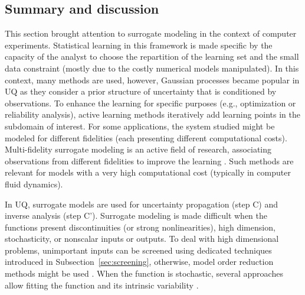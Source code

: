 \subsection{Summary and discussion}

This section brought attention to surrogate modeling in the context of computer experiments. 
Statistical learning in this framework is made specific by the capacity of the analyst to choose the repartition of the learning set and the small data constraint (mostly due to the costly numerical models manipulated). 
In this context, many methods are used, however, Gaussian processes became popular in UQ as they consider a prior structure of uncertainty that is conditioned by observations. %
To enhance the learning for specific purposes (e.g., optimization or reliability analysis), active learning methods iteratively add learning points in the subdomain of interest. 
For some applications, the system studied might be modeled for different fidelities (each presenting different computational costs). 
Multi-fidelity surrogate modeling is an active field of research, associating observations from different fidelities to improve the learning \citep{fernandez_2016_review_multifi}. 
Such methods are relevant for models with a very high computational cost (typically in computer fluid dynamics).  

In UQ, surrogate models are used for uncertainty propagation (step C) and inverse analysis (step C'). 
Surrogate modeling is made difficult when the functions present discontinuities (or strong nonlinearities), high dimension, stochasticity, or nonscalar inputs or outputs. 
To deal with high dimensional problems, unimportant inputs can be screened using dedicated techniques introduced in Subsection~\ref{sec:screening}, otherwise, model order reduction methods might be used \citep{schilders_2008}. 
When the function is stochastic, several approaches allow fitting the function and its intrinsic variability \citep{binois_2019_replication,baker_2022_stochastic_surrogates_review,zhu_2023_thesis}. 



